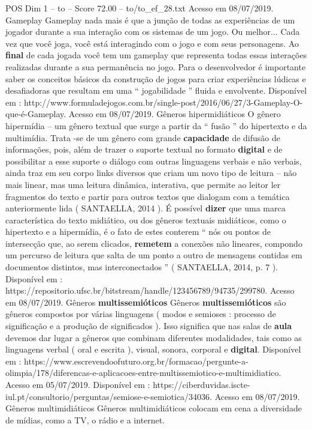 \begin{textsample}{POS Dim 1 – to – Score 72.00 – to/to\_ef\_28.txt}
Acesso em 08/07/2019.
Gameplay Gameplay nada mais é que a junção de todas as experiências de um jogador durante a sua interação com os sistemas de um jogo.
Ou melhor...
Cada vez que você joga, você está interagindo com o jogo e com seus personagens.
Ao \textbf{final} de cada jogada você tem um gameplay que representa todas essas interações realizadas durante a sua permanência no jogo.
Para o desenvolvedor é importante saber os conceitos básicos da construção de jogos para criar experiências lúdicas e desafiadoras que resultam em uma “ jogabilidade ” fluida e envolvente.
Disponível em : http://www.formuladejogos.com.br/single-post/2016/06/27/3-Gameplay-O-que-é-Gameplay.
Acesso em 08/07/2019.
Gêneros hipermidiáticos O gênero hipermídia – um gênero textual que surge a partir da “ fusão ” do hipertexto e da multimídia.
Trata -se de um gênero com grande \textbf{capacidade} de difusão de informações, pois, além de trazer o suporte textual no formato \textbf{digital} e de possibilitar a esse suporte o diálogo com outras linguagens verbais e não verbais, ainda traz em seu corpo links diversos que criam um novo tipo de leitura – não mais linear, mas uma leitura dinâmica, interativa, que permite ao leitor ler fragmentos do texto e partir para outros textos que dialogam com a temática anteriormente lida ( SANTAELLA, 2014 ).
É possível \textbf{dizer} que uma marca característica do texto midiático, ou dos gêneros textuais midiáticos, como o hipertexto e a hipermídia, é o fato de estes conterem “ nós ou pontos de intersecção que, ao serem clicados, \textbf{remetem} a conexões não lineares, compondo um percurso de leitura que salta de um ponto a outro de mensagens contidas em documentos distintos, mas interconectados ” ( SANTAELLA, 2014, p. 7 ).
Disponível em : https://repositorio.ufsc.br/bitstream/handle/123456789/94735/299780.
Acesso em 08/07/2019.
Gêneros \textbf{multissemióticos} Gêneros \textbf{multissemióticos} são gêneros compostos por várias linguagens ( modos e semioses : processo de significação e a produção de significados ).
Isso significa que nas salas de \textbf{aula} devemos dar lugar a gêneros que combinam diferentes modalidades, tais como as linguagens verbal ( oral e escrita ), visual, sonora, corporal e \textbf{digital}.
Disponível em : https://www.escrevendoofuturo.org.br/formacao/pergunte-a-olimpia/178/diferencas-e-aplicacoes-entre-multissemiotico-e-multimidiatico.
Acesso em 05/07/2019.
Disponível em : https://ciberduvidas.iscte-iul.pt/consultorio/perguntas/semiose-e-semiotica/34036.
Acesso em 08/07/2019.
Gêneros multimidiáticos Gêneros multimidiáticos colocam em cena a diversidade de mídias, como a TV, o rádio e a internet.

\end{textsample}
